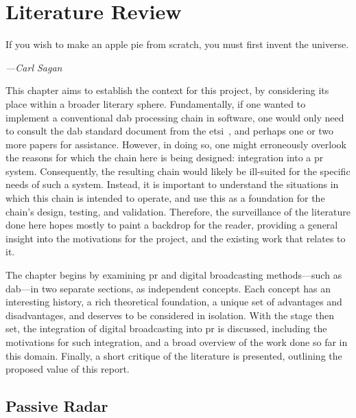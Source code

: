 \documentclass[class=report,11pt,crop=false]{standalone}
\begin{document}
\ifstandalone
\tableofcontents
\fi
\chapter{Literature Review \label{ch:literature}}
\epigraph{If you wish to make an apple pie from scratch, you must first invent the universe.}%
    {\emph{---Carl Sagan}}
\vspace{0.5cm}
This chapter aims to establish the context for this project, by considering its place within a broader literary sphere. Fundamentally, if one wanted to implement a conventional \gls{dab} processing chain in software, one would only need to consult the \gls{dab} standard document from the \gls{etsi}~\cite{dabstandard}, and perhaps one or two more papers for assistance. However, in doing so, one might erroneously overlook the reasons for which the chain here is being designed: integration into a \gls{pr} system. Consequently, the resulting chain would likely be ill-suited for the specific needs of such a system. Instead, it is important to understand the situations in which this chain is intended to operate, and use this as a foundation for the chain's design, testing, and validation. Therefore, the surveillance of the literature done here hopes mostly to paint a backdrop for the reader, providing a general insight into the motivations for the project, and the existing work that relates to it.

The chapter begins by examining \gls{pr} and digital broadcasting methods---such as \gls{dab}---in two separate sections, as independent concepts. Each concept has an interesting history, a rich theoretical foundation, a unique set of advantages and disadvantages, and deserves to be considered in isolation. With the stage then set, the integration of digital broadcasting into \gls{pr} is discussed, including the motivations for such integration, and a broad overview of the work done so far in this domain. Finally, a short critique of the literature is presented, outlining the proposed value of this report.

\section{Passive Radar}
\end{document}
